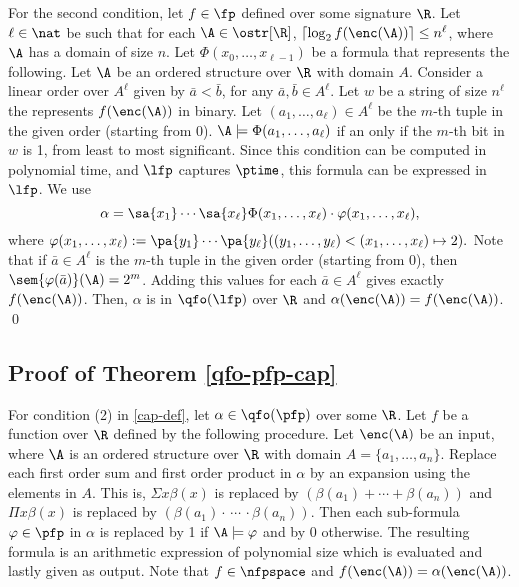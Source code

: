 For the second condition, let $f\in \fp$ defined over some signature $\R$. Let $\ell\in\nat$ be such that for each $\A\in\ostr[\R]$, $\lceil\log_2 f(\enc(\A)) \rceil \leq n^\ell$, where $\A$ has a domain of size $n$. Let $\Phi(x_0,\ldots,x_{\ell-1})$ be a formula that represents the following. Let $\A$ be an ordered structure over $\R$ with domain $A$. Consider a linear order over $A^{\ell}$ given by $\bar{a} < \bar{b}$, for any $\bar{a},\bar{b}\in A^{\ell}$. Let $w$ be a string of size $n^{\ell}$ the represents $f(\enc(\A))$ in binary. Let $(a_1,\ldots,a_{\ell})\in A^{\ell}$ be the $m$-th tuple in the given order (starting from 0). $\A\models\Phi(a_1,\ldots,a_{\ell})$ if an only if the $m$-th bit in $w$ is 1, from least to most significant. Since this condition can be computed in polynomial time, and $\lfp$ captures $\ptime$, this formula can be expressed in $\lfp$. We use
$$
\alpha = \sa{x_1} \cdots \sa{x_{\ell}} \Phi(x_1,\ldots,x_{\ell})\cdot\varphi(x_1,\ldots,x_{\ell}),
$$
where $\varphi(x_1,\ldots,x_{\ell}) := \pa{y_1}\cdots\pa{y_{\ell}}((y_1,\ldots,y_{\ell}) < (x_1,\ldots,x_{\ell}) \mapsto 2).$ Note that if $\bar{a} \in A^{\ell}$ is the $m$-th tuple in the given order (starting from 0), then $\sem{\varphi(\bar{a})}(\A) = 2^{m}$. Adding this values for each $\bar{a}\in A^{\ell}$ gives exactly $f(\enc(\A))$. Then, $\alpha$ is in $\qfo(\lfp)$ over $\R$ and $\alpha(\enc(\A)) = f(\enc(\A))$. \qed

\subsection*{Proof of Theorem \ref{qfo-pfp-cap}}


For condition (2) in \ref{cap-def}, let $\alpha\in\qfo(\pfp)$ over some $\R$. Let $f$ be a function over $\R$ defined by the following procedure. Let $\enc(\A)$ be an input, where $\A$ is an ordered structure over $\R$ with domain $A = \{a_1,\ldots,a_n\}$. Replace each first order sum and first order product in $\alpha$ by an expansion using the elements in $A$. This is, $\Sigma x \beta(x)$ is replaced by $(\beta(a_1)+\cdots+\beta(a_n))$ and $\Pi x \beta(x)$ is replaced by $(\beta(a_1)\cdot\,\cdots\,\cdot\beta(a_n))$. Then each sub-formula $\varphi\in\pfp$ in $\alpha$ is replaced by 1 if $\A\models\varphi$ and by 0 otherwise. The resulting formula is an arithmetic expression of polynomial size which is evaluated and lastly given as output. Note that $f\in\nfpspace$ and $f(\enc(\A)) = \alpha(\enc(\A))$.

